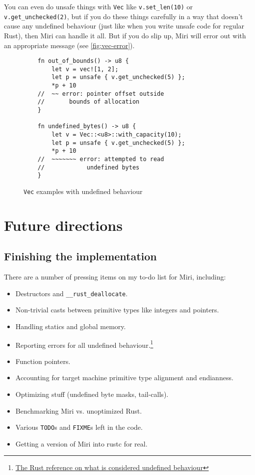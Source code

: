 \documentclass[twocolumn]{article}
\newcommand{\rust}[1]{\texttt{#1}}
\begin{document}
You can even do unsafe things with \rust{Vec} like \rust{v.set_len(10)} or
\rust{v.get_unchecked(2)}, but if you do these things carefully in a way that doesn't cause any
undefined behaviour (just like when you write unsafe code for regular Rust), then Miri can handle it
all. But if you do slip up, Miri will error out with an appropriate message (see
\autoref{fig:vec-error}).

\begin{figure}[t]
  \begin{verbatim}
    fn out_of_bounds() -> u8 {
        let v = vec![1, 2];
        let p = unsafe { v.get_unchecked(5) };
        *p + 10
    //  ~~ error: pointer offset outside
    //       bounds of allocation
    }

    fn undefined_bytes() -> u8 {
        let v = Vec::<u8>::with_capacity(10);
        let p = unsafe { v.get_unchecked(5) };
        *p + 10
    //  ~~~~~~~ error: attempted to read
    //            undefined bytes
    }
  \end{verbatim}
  \caption{\rust{Vec} examples with undefined behaviour}
  \label{fig:vec-error}
\end{figure}


\section{Future directions}

\subsection{Finishing the implementation}

There are a number of pressing items on my to-do list for Miri, including:

\begin{itemize}
  \item Destructors and \rust{__rust_deallocate}.
  \item Non-trivial casts between primitive types like integers and pointers.
  \item Handling statics and global memory.
  \item Reporting errors for all undefined behaviour.\footnote{\href{https://doc.rust-lang.org/reference.html\#behavior-considered-undefined}{The Rust reference on what is considered undefined behaviour}}
  \item Function pointers.
  \item Accounting for target machine primitive type alignment and endianness.
  \item Optimizing stuff (undefined byte masks, tail-calls).
  \item Benchmarking Miri vs. unoptimized Rust.
  \item Various \texttt{TODO}s and \texttt{FIXME}s left in the code.
  \item Getting a version of Miri into rustc for real.
\end{itemize}
\end{document}

